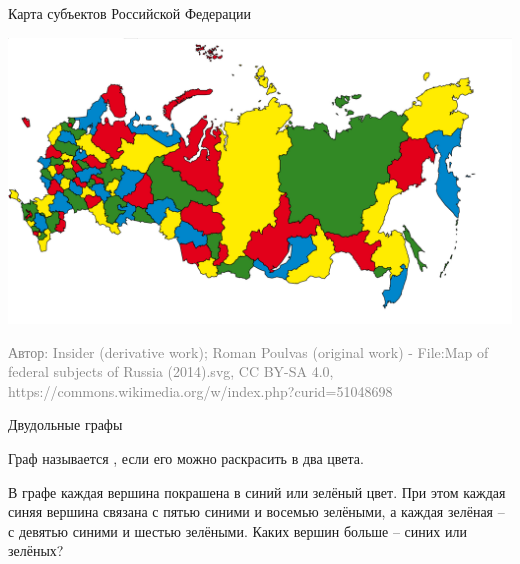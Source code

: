 \begin{frame}{Карта субъектов Российской Федерации}

\centerline{\includegraphics[scale=0.5]{img/map.png}}

\textcolor{Gray}{\tiny Автор: Insider (derivative work); Roman Poulvas (original work) - File:Map of federal subjects of Russia (2014).svg, CC BY-SA 4.0, https://commons.wikimedia.org/w/index.php?curid=51048698}

\end{frame}


\begin{frame}{Двудольные графы}

 Граф называется , если его можно раскрасить в два цвета.

\exmpl В графе каждая вершина покрашена в синий или зелёный цвет. При этом каждая синяя вершина связана с пятью синими и восемью зелёными, а каждая зелёная -- с девятью синими и шестью зелёными. Каких вершин больше -- синих или зелёных?


\end{frame}


